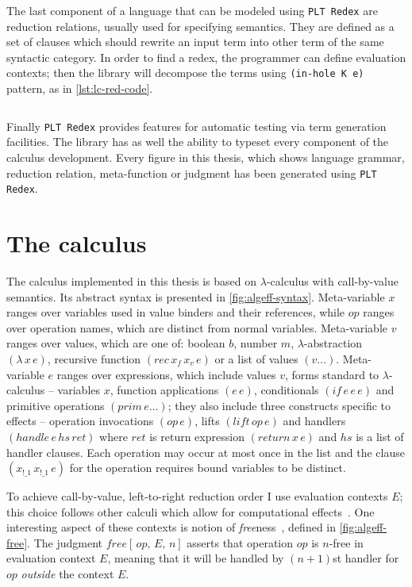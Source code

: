 \documentclass[inz, english, longabstract]{iithesis}
\newcommand{\Redex}{\texttt{PLT Redex}}
\newcommand{\LC}{\(\lambda\)-calculus}
\begin{document}
The last component of a language that can be modeled using \Redex{} are reduction relations, usually used for specifying semantics.
They are defined as a set of clauses which should rewrite an input term into other term of the same syntactic category.
In order to find a redex, the programmer can define evaluation contexts; then the library will decompose the terms using \texttt{(in-hole K e)} pattern, as in \autoref{lst:lc-red-code}.
\begin{listing}[t]
  \inputminted[firstline=19,lastline=23]{Racket}{../lc/lc.rkt}
  \caption{Reduction relation for \LC{} in \Redex{}}
  \label{lst:lc-red-code}
\end{listing}
Finally \Redex{} provides features for automatic testing via term generation facilities. The library has as well the ability to typeset every component of the calculus development.
Every figure in this thesis, which shows language grammar, reduction relation, meta-function or judgment has been generated using \Redex{}.

\chapter{The calculus}\label{ch:calculus}
The calculus implemented in this thesis is based on \LC{} with call-by-value semantics.
Its abstract syntax is presented in \autoref{fig:algeff-syntax}.
Meta-variable $ x $ ranges over variables used in value binders and their references, while $ op $ ranges over operation names, which are distinct from normal variables.
Meta-variable $ v $ ranges over values, which are one of: boolean $ b $, number $ m $, $ \lambda $-abstraction $(\lambda \, x \, e)$, recursive function $(rec \, x_f \, x_v \, e)$ or a list of values $(v \ldots)$.
Meta-variable $ e $ ranges over expressions, which include values $ v $, forms standard to \LC{} -- variables $ x $, function applications $ (e \, e) $, conditionals $ (if \, e \,e \, e) $ and primitive operations $ (prim \, e \ldots) $; they also include three constructs specific to effects -- operation invocations $ (op \, e) $, lifts $ (lift \, op \, e) $ and handlers $ (handle \, e \, hs \, ret) $ where $ ret $ is return expression $ (return \, x \, e) $ and $ hs $ is a list of handler clauses.
Each operation may occur at most once in the list and the clause $(x_{!\_1} \, x_{!\_1} \, e)$ for the operation requires bound variables to be distinct.

To achieve call-by-value, left-to-right reduction order I use evaluation contexts $ E $; this choice follows other calculi which allow for computational effects~\cite{Biernacki2017, Leijen2014, Hillerstrom2016}.
One interesting aspect of these contexts is notion of \emph{free}ness~\cite{Biernacki2017}, defined in \autoref{fig:algeff-free}.
The judgment $ free[ \, op , \, E , \, n] $ asserts that operation $ op $ is $ n $-free in evaluation context $ E $, meaning that it will be handled by $(n + 1)$st handler for $ op $ \emph{outside} the context $ E $.
\end{document}
